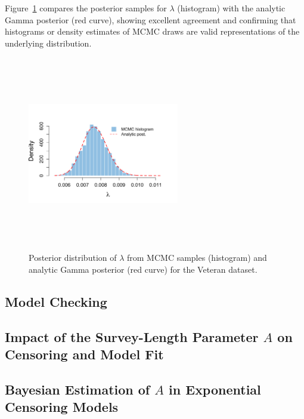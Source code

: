 Figure~\ref{fig:exp veteran} compares the posterior samples for $\lambda$ (histogram) with the analytic Gamma posterior (red curve), showing excellent agreement and confirming that histograms or density estimates of MCMC draws are valid representations of the underlying distribution.
\begin{figure}[H]
    \centering
    \includegraphics[height=8.5cm, width=0.59\textwidth]{images/veteran_post_lam.png}
    \caption{{\small Posterior distribution of $\lambda$ from MCMC samples (histogram) and analytic Gamma posterior (red curve) for the Veteran dataset.}}
    \label{fig:exp veteran}
\end{figure}










\subsection{Model Checking}\label{sec:model checking}


\subsection{Impact of the Survey-Length Parameter \texorpdfstring{$A$}{A} on Censoring and Model Fit}
\label{Impact of A}



\subsection{Bayesian Estimation of \texorpdfstring{$A$}{A} in Exponential Censoring Models}



